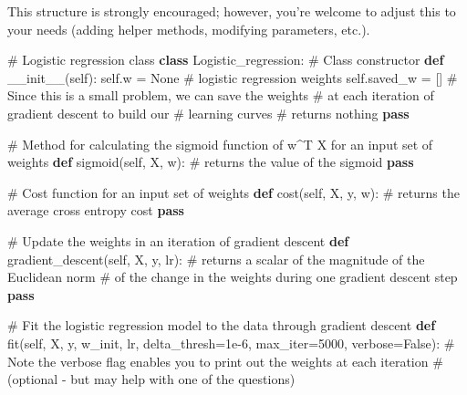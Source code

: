 \documentclass[
  letterpaper,
  DIV=11,
  numbers=noendperiod]{scrartcl}
\newenvironment{Shaded}{\begin{snugshade}}{\end{snugshade}}
\newcommand{\CommentTok}[1]{\textcolor[rgb]{0.37,0.37,0.37}{#1}}
\newcommand{\ControlFlowTok}[1]{\textcolor[rgb]{0.00,0.23,0.31}{\textbf{#1}}}
\newcommand{\DecValTok}[1]{\textcolor[rgb]{0.68,0.00,0.00}{#1}}
\newcommand{\FloatTok}[1]{\textcolor[rgb]{0.68,0.00,0.00}{#1}}
\newcommand{\FunctionTok}[1]{\textcolor[rgb]{0.28,0.35,0.67}{#1}}
\newcommand{\KeywordTok}[1]{\textcolor[rgb]{0.00,0.23,0.31}{\textbf{#1}}}
\newcommand{\NormalTok}[1]{\textcolor[rgb]{0.00,0.23,0.31}{#1}}
\newcommand{\OperatorTok}[1]{\textcolor[rgb]{0.37,0.37,0.37}{#1}}
\newcommand{\VariableTok}[1]{\textcolor[rgb]{0.07,0.07,0.07}{#1}}
\begin{document}
This structure is strongly encouraged; however, you're welcome to adjust
this to your needs (adding helper methods, modifying parameters, etc.).

\begin{Shaded}
\begin{Highlighting}[]
\CommentTok{\# Logistic regression class}
\KeywordTok{class}\NormalTok{ Logistic\_regression:}
    \CommentTok{\# Class constructor}
    \KeywordTok{def} \FunctionTok{\_\_init\_\_}\NormalTok{(}\VariableTok{self}\NormalTok{):}
        \VariableTok{self}\NormalTok{.w }\OperatorTok{=} \VariableTok{None}     \CommentTok{\# logistic regression weights}
        \VariableTok{self}\NormalTok{.saved\_w }\OperatorTok{=}\NormalTok{ [] }\CommentTok{\# Since this is a small problem, we can save the weights}
                          \CommentTok{\#  at each iteration of gradient descent to build our }
                          \CommentTok{\#  learning curves}
        \CommentTok{\# returns nothing}
        \ControlFlowTok{pass}
    
    \CommentTok{\# Method for calculating the sigmoid function of w\^{}T X for an input set of weights}
    \KeywordTok{def}\NormalTok{ sigmoid(}\VariableTok{self}\NormalTok{, X, w):}
        \CommentTok{\# returns the value of the sigmoid}
        \ControlFlowTok{pass}
    
    \CommentTok{\# Cost function for an input set of weights}
    \KeywordTok{def}\NormalTok{ cost(}\VariableTok{self}\NormalTok{, X, y, w):}
        \CommentTok{\# returns the average cross entropy cost}
        \ControlFlowTok{pass}
    
    \CommentTok{\# Update the weights in an iteration of gradient descent}
    \KeywordTok{def}\NormalTok{ gradient\_descent(}\VariableTok{self}\NormalTok{, X, y, lr):}
        \CommentTok{\# returns a scalar of the magnitude of the Euclidean norm }
        \CommentTok{\#  of the change in the weights during one gradient descent step}
        \ControlFlowTok{pass}
    
    \CommentTok{\# Fit the logistic regression model to the data through gradient descent}
    \KeywordTok{def}\NormalTok{ fit(}\VariableTok{self}\NormalTok{, X, y, w\_init, lr, delta\_thresh}\OperatorTok{=}\FloatTok{1e{-}6}\NormalTok{, max\_iter}\OperatorTok{=}\DecValTok{5000}\NormalTok{, verbose}\OperatorTok{=}\VariableTok{False}\NormalTok{):}
        \CommentTok{\# Note the verbose flag enables you to print out the weights at each iteration }
        \CommentTok{\#  (optional {-} but may help with one of the questions)}
        

\end{Highlighting}
\end{Shaded}
\end{document}
